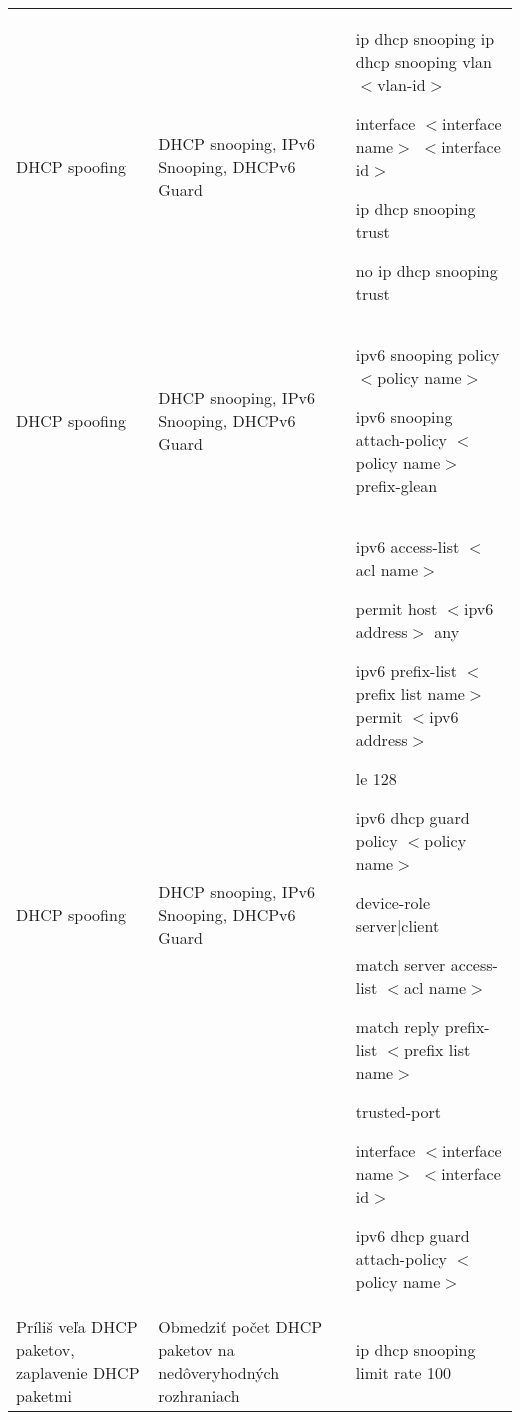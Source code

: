 \begin{longtable}[!htbp]{|L{10em}L{10em}>{\selectfont}L{34em}|}
	
	
	
	DHCP spoofing	&DHCP snooping, IPv6 Snooping, DHCPv6 Guard	&ip dhcp snooping
	ip dhcp snooping vlan $<$vlan-id$>$ 
	
	interface $<$interface name$>$ $<$interface id$>$
	
	\hspace{0.5em}ip dhcp snooping trust
	
	\hspace{0.5em}no ip dhcp snooping trust\\
	
	
	
	
	DHCP spoofing	&DHCP snooping, IPv6 Snooping, DHCPv6 Guard	&ipv6 snooping policy $<$policy name$>$
	
	\hspace{0.5em}ipv6 snooping attach-policy $<$policy name$>$
	\hspace{0.5em}prefix-glean\\
	
	
	
	 DHCP spoofing	&DHCP snooping, IPv6 Snooping, DHCPv6 Guard	&ipv6 access-list $<$acl name$>$
	
	\hspace{0.5em}permit host $<$ipv6 address$>$ any
	
	ipv6 prefix-list $<$prefix list name$>$ permit $<$ipv6 address$>$  
	
	\hspace{0.5em}le 128
	
	ipv6 dhcp guard policy $<$policy name$>$
	
	\hspace{0.5em}device-role server|client
	
	\hspace{0.5em}match server access-list $<$acl name$>$
	
	\hspace{0.5em}match reply prefix-list $<$prefix list name$>$
	
	\hspace{0.5em}trusted-port
	
	interface $<$interface name$>$ $<$interface id$>$
	
	\hspace{0.5em}ipv6 dhcp guard attach-policy $<$policy name$>$\\
	
	
	
	
	Príliš veľa DHCP paketov, zaplavenie DHCP paketmi	&Obmedziť počet DHCP paketov na nedôveryhodných rozhraniach	&ip dhcp snooping limit rate 100 \\
	

\end{longtable}

